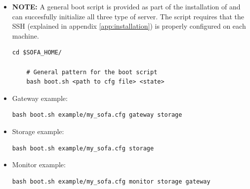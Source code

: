 \begin{itemize}
	\item {\sffamily\textbf{NOTE:}} A general boot script is provided as part of the installation of \CodeName and can succesfully initialize all three type of server. The script requires that the SSH (explained in appendix \ref{app:installation}) is properly configured on each machine.
	\begin{lstlisting}[numbers=none, backgroundcolor=\color{sourcebackground}, rulecolor=\color{sourcebackground}, framextopmargin=5pt, framexbottommargin=5pt, frame=tb, xrightmargin=15pt, commentstyle=\color{bashcommetcolor}, showstringspaces=false, deletendkeywords={file, list}]
	cd $SOFA_HOME/
	
	# General pattern for the boot script
	bash boot.sh <path to cfg file> <state>
	\end{lstlisting}
	\vspace*{-6mm}

	\item Gateway example:
	\begin{lstlisting}[numbers=none, backgroundcolor=\color{sourcebackground}, rulecolor=\color{sourcebackground}, framextopmargin=5pt, framexbottommargin=5pt, frame=tb, xrightmargin=15pt, commentstyle=\color{bashcommetcolor}, showstringspaces=false]
	bash boot.sh example/my_sofa.cfg gateway storage
	\end{lstlisting}
	\vspace*{-6mm}
	
	\item Storage example:
	\begin{lstlisting}[numbers=none, backgroundcolor=\color{sourcebackground}, rulecolor=\color{sourcebackground}, framextopmargin=5pt, framexbottommargin=5pt, frame=tb, xrightmargin=15pt, commentstyle=\color{bashcommetcolor}, showstringspaces=false]
	bash boot.sh example/my_sofa.cfg storage
	\end{lstlisting}
	\vspace*{-6mm}
	
	\item Monitor example:
	\begin{lstlisting}[numbers=none, backgroundcolor=\color{sourcebackground}, rulecolor=\color{sourcebackground}, framextopmargin=5pt, framexbottommargin=5pt, frame=tb, xrightmargin=15pt, commentstyle=\color{bashcommetcolor}, showstringspaces=false]
	bash boot.sh example/my_sofa.cfg monitor storage gateway
	\end{lstlisting}	
\end{itemize}

